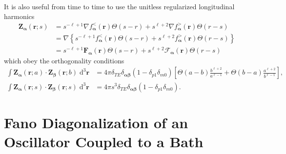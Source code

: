 \documentclass{article}
\begin{document}
It is also useful from time to time to use the unitless regularized longitudinal harmonics
\begin{equation}
\begin{split}
\mathbf{Z}_{\bm{\alpha}}(\mathbf{r};s) &= s^{-\ell + 1}\nabla f_{\bm{\alpha}}^<(\mathbf{r})\Theta(s - r) + s^{\ell + 2}\nabla f_{\bm{\alpha}}^>(\mathbf{r})\Theta(r - s)\\
&= \nabla\left\{s^{-\ell + 1} f_{\bm{\alpha}}^<(\mathbf{r})\Theta(s - r) + s^{\ell + 2} f_{\bm{\alpha}}^>(\mathbf{r})\Theta(r - s)\right\}\\
&= s^{-\ell + 1}\mathbf{F}_{\bm{\alpha}}(\mathbf{r})\Theta(s - r) + s^{\ell + 2}\bm{\mathcal{F}}_{\bm{\alpha}}(\mathbf{r})\Theta(r - s)
\end{split}
\end{equation}
which obey the orthogonality conditions
\begin{equation}
\begin{split}
\int\mathbf{Z}_{\bm{\alpha}}(\mathbf{r};a)\cdot\mathbf{Z}_{\bm{\beta}}(\mathbf{r};b)\;\mathrm{d}^3\mathbf{r} &= 4\pi\delta_{TE}\delta_{\bm{\alpha}\bm{\beta}}(1 - \delta_{p1}\delta_{m0})\left[\Theta(a - b)\frac{b^{\ell + 2}}{a^{\ell - 1}} + \Theta(b - a)\frac{a^{\ell + 2}}{b^{\ell - 1}}\right],\\
\int\mathbf{Z}_{\bm{\alpha}}(\mathbf{r};s)\cdot\mathbf{Z}_{\bm{\beta}}(\mathbf{r};s)\;\mathrm{d}^3\mathbf{r} &= 4\pi s^3\delta_{TE}\delta_{\bm{\alpha}\bm{\beta}}(1 - \delta_{p1}\delta_{m0}).
\end{split}
\end{equation}















\section{Fano Diagonalization of an Oscillator Coupled to a Bath}\label{app:fanoDiagonalization}
\end{document}
